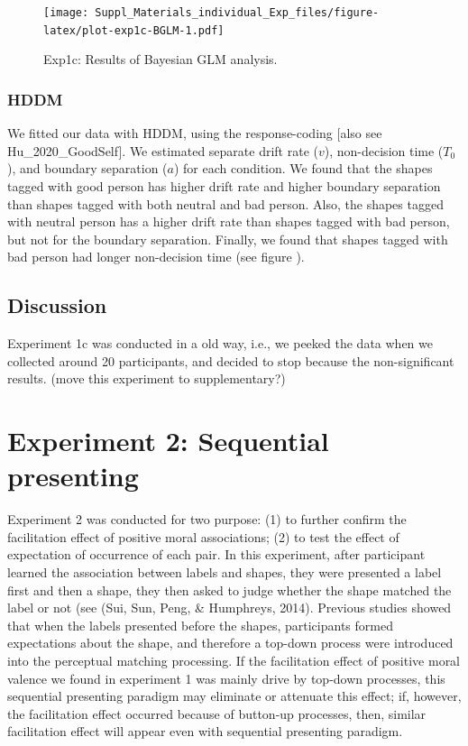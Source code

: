 \documentclass[
  english,
  man]{apa6}
\begin{document}
\begin{figure}
\centering
\texttt{[image: Suppl\_Materials\_individual\_Exp\_files/figure-latex/plot-exp1c-BGLM-1.pdf]}
\caption{\label{fig:plot-exp1c-BGLM}Exp1c: Results of Bayesian GLM analysis.}
\end{figure}

\hypertarget{hddm-2}{%
\subsubsection{HDDM}\label{hddm-2}}

We fitted our data with HDDM, using the response-coding {[}also see Hu\_2020\_GoodSelf{]}. We estimated separate drift rate (\(v\)), non-decision time (\(T_{0}\)), and boundary separation (\(a\)) for each condition. We found that the shapes tagged with good person has higher drift rate and higher boundary separation than shapes tagged with both neutral and bad person. Also, the shapes tagged with neutral person has a higher drift rate than shapes tagged with bad person, but not for the boundary separation. Finally, we found that shapes tagged with bad person had longer non-decision time (see figure ).

\hypertarget{discussion-1}{%
\subsection{Discussion}\label{discussion-1}}

Experiment 1c was conducted in a old way, i.e., we peeked the data when we collected around 20 participants, and decided to stop because the non-significant results. (move this experiment to supplementary?)

\hypertarget{experiment-2-sequential-presenting}{%
\section{Experiment 2: Sequential presenting}\label{experiment-2-sequential-presenting}}

Experiment 2 was conducted for two purpose: (1) to further confirm the facilitation effect of positive moral associations; (2) to test the effect of expectation of occurrence of each pair. In this experiment, after participant learned the association between labels and shapes, they were presented a label first and then a shape, they then asked to judge whether the shape matched the label or not (see (Sui, Sun, Peng, \& Humphreys, 2014). Previous studies showed that when the labels presented before the shapes, participants formed expectations about the shape, and therefore a top-down process were introduced into the perceptual matching processing. If the facilitation effect of positive moral valence we found in experiment 1 was mainly drive by top-down processes, this sequential presenting paradigm may eliminate or attenuate this effect; if, however, the facilitation effect occurred because of button-up processes, then, similar facilitation effect will appear even with sequential presenting paradigm.
\end{document}
